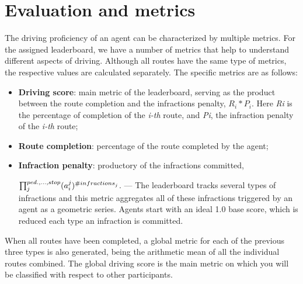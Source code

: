 \documentclass{article}
\begin{document}
\section{Evaluation and metrics}
The driving proficiency of an agent can be characterized by multiple metrics. For the assigned leaderboard, we have a number of metrics that help 
to understand different aspects of driving. Although all routes have the same type of metrics, the respective values are calculated separately. 
The specific metrics are as follows:
\begin{itemize}
  \item \textbf{Driving score}: main metric of the leaderboard, serving as the product between the route completion and the infractions penalty, $R_i * P_i$.
  Here \textit{Ri} is the percentage of completion of the \textit{i-th} route, and \textit{Pi}, 
  the infraction penalty of the \textit{i-th} route;
  \item \textbf{Route completion}: percentage of the route completed by the agent;
  \item \textbf{Infraction penalty}: productory of the infractions committed,

  
  $\prod_{j}^{ped., ..., stop} (a_{\small{i}}^{\small{j}})^{\small{\#infractions}_j}$. — 
  The leaderboard tracks several types of infractions and this metric aggregates all of these infractions triggered by an agent as a geometric series. Agents start with an ideal 1.0 
  base score, which is reduced each type an infraction is committed.
\end{itemize}
When all routes have been completed, a global metric for each of the previous three types is also generated, being the arithmetic mean of all the individual routes combined. 
The global driving score is the main metric on which you will be classified with respect to other participants.
\end{document}
